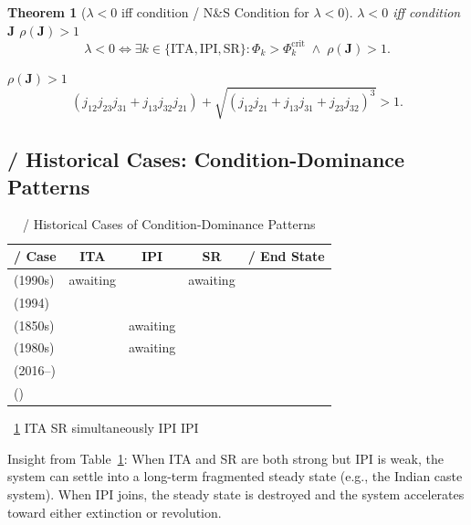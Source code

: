 \documentclass[11pt,a4paper]{article}
\newtheorem{theorem}{Theorem}[section]
\theoremstyle{remark}
\newcommand{\lambdaparam}{\lambda}
\begin{document}
\begin{theorem}[$\lambdaparam < 0$ iff condition / N\&S Condition for $\lambdaparam < 0$]
\label{thm:lambda_negative}
$\lambdaparam < 0$ iff condition
 $\mathbf{J}$  $\rho(\mathbf{J}) > 1$
\[
\lambdaparam < 0 \iff \exists k \in \{\text{ITA}, \text{IPI}, \text{SR}\}: 
\Phi_k > \Phi_k^{\text{crit}} \; \land \; \rho(\mathbf{J}) > 1.
\]

$\rho(\mathbf{J}) > 1$ 
\[
(j_{12}j_{23}j_{31} + j_{13}j_{32}j_{21}) + 
\sqrt{(j_{12}j_{21} + j_{13}j_{31} + j_{23}j_{32})^3} > 1.
\]
\end{theorem}

\subsection{ / Historical Cases: Condition-Dominance Patterns}

\begin{table}[htbp]
\centering
\caption{ / Historical Cases of Condition-Dominance Patterns}
\label{tab:historical}
\begin{tabular}{@{}lcccc@{}}
\toprule
\textbf{ / Case} &
  \textbf{ITA} &
  \textbf{IPI} &
  \textbf{SR} &
  \textbf{ / End State} \\
\midrule
 (1990s)       & awaiting & \textbf{} & awaiting &  \\
 (1994)            & \textbf{} &  &    &    \\
 (1850s)   &    & awaiting & \textbf{} &    \\
 (1980s) &    & awaiting & \textbf{} &    \\
 (2016--)  &    & \textbf{} &    &    \\
 ()        & \textbf{} &    & \textbf{} & \\
\bottomrule
\end{tabular}
\end{table}

~\ref{tab:historical} ITA  SR simultaneously IPI 
 IPI 

Insight from Table~\ref{tab:historical}: When ITA and SR are both strong but IPI is weak,
the system can settle into a long-term fragmented steady state (e.g., the Indian caste
system). When IPI joins, the steady state is destroyed and the system accelerates
toward either extinction or revolution.

\section{}
\end{document}
